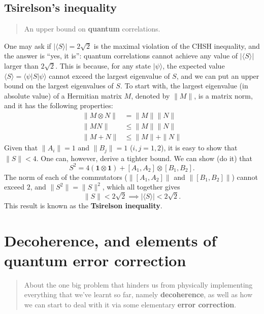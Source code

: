 \documentclass[fleqn]{article}
\let\oldsection\section
\renewcommand\section{\clearpage\oldsection}
\begin{document}
\hypertarget{tsirelsons-inequality}{%
\subsection{Tsirelson's inequality}\label{tsirelsons-inequality}}

\begin{quote}
An upper bound on \textbf{quantum} correlations.
\end{quote}

One may ask if \(|\langle S\rangle|= 2\sqrt{2}\) is the maximal violation of the CHSH inequality, and the answer is ``yes, it is'': quantum correlations cannot achieve any value of \(|\langle S\rangle|\) larger than \(2\sqrt{2}\).
This is because, for any state \(|\psi\rangle\), the expected value \(\langle S\rangle = \langle\psi|S|\psi\rangle\) cannot exceed the largest eigenvalue of \(S\), and we can put an upper bound on the largest eigenvalues of \(S\).
To start with, the largest eigenvalue (in absolute value) of a Hermitian matrix \(M\), denoted by \(\|M\|\), is a matrix norm, and it has the following properties:
\[
\begin{aligned}
  \|M\otimes N\|
  & = \|M\| \|N\|
\\\|MN\|
  & \leqslant\|M\| \|N\|
\\\|M+N\|
  & \leqslant\|M\| + \|N\|
\end{aligned}
\]
Given that \(\|A_i\|=1\) and \(\|B_j\|=1\) (\(i,j=1,2\)), it is easy to show that \(\|S\| < 4\).
One can, however, derive a tighter bound.
We can show (do it) that
\[
  S^2
  = 4(\mathbf{1}\otimes\mathbf{1}) + [A_1,A_2]\otimes[B_1,B_2].
\]
The norm of each of the commutators (\(\|[A_1, A_2]\|\) and \(\|[B_1, B_2]\|\)) cannot exceed \(2\), and \(\|S^2\|=\|S\|^2\), which all together gives
\[
  \|S\|
  < 2\sqrt{2}
  \implies
  |\langle S\rangle| < 2\sqrt{2}.
\]
This result is known as the \textbf{Tsirelson inequality}.

\hypertarget{chapter8}{%
\section{Decoherence, and elements of quantum error correction}\label{chapter8}}

\begin{quote}
About the one big problem that hinders us from physically implementing everything that we've learnt so far, namely \textbf{decoherence}, as well as how we can start to deal with it via some elementary \textbf{error correction}.
\end{quote}
\end{document}

